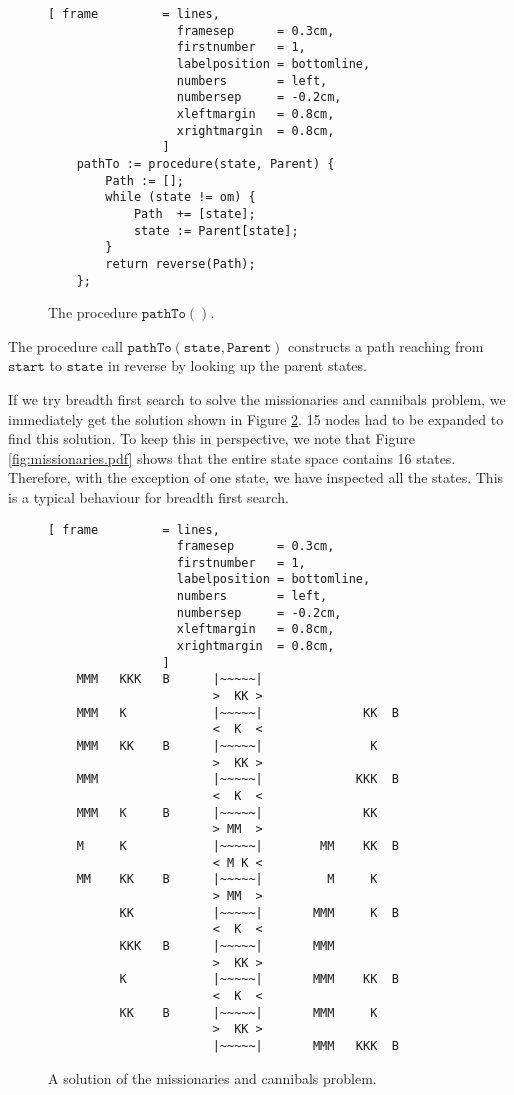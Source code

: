 \begin{figure}[!ht]
\centering
\begin{Verbatim}[ frame         = lines, 
                  framesep      = 0.3cm, 
                  firstnumber   = 1,
                  labelposition = bottomline,
                  numbers       = left,
                  numbersep     = -0.2cm,
                  xleftmargin   = 0.8cm,
                  xrightmargin  = 0.8cm,
                ]
    pathTo := procedure(state, Parent) {
        Path := [];
        while (state != om) {
            Path  += [state];
            state := Parent[state];
        }
        return reverse(Path);
    };
\end{Verbatim}
\vspace*{-0.3cm}
\caption{The procedure $\mathtt{pathTo}()$.}
\label{fig:pathTo.stlx}
\end{figure}
The procedure call $\mathtt{pathTo}(\mathtt{state}, \mathtt{Parent})$ constructs a path reaching
from $\mathtt{start}$ to $\mathtt{state}$ in reverse by looking up the parent states.

If we try breadth first search to solve the missionaries and cannibals problem, we immediately get
the solution shown in Figure \ref{fig:missionaries.solution}.  15 nodes had to be expanded to find
this solution.  To keep this in perspective, we note that Figure \ref{fig:missionaries.pdf} shows
that the entire state space contains 16 states.  Therefore, with the exception of one state, we have
inspected all the states.  This is a typical behaviour for breadth first search.

\begin{figure}[!ht]
\centering
\begin{Verbatim}[ frame         = lines, 
                  framesep      = 0.3cm, 
                  firstnumber   = 1,
                  labelposition = bottomline,
                  numbers       = left,
                  numbersep     = -0.2cm,
                  xleftmargin   = 0.8cm,
                  xrightmargin  = 0.8cm,
                ]
    MMM   KKK   B      |~~~~~|                   
                       >  KK >
    MMM   K            |~~~~~|              KK  B
                       <  K  <
    MMM   KK    B      |~~~~~|               K   
                       >  KK >
    MMM                |~~~~~|             KKK  B
                       <  K  <
    MMM   K     B      |~~~~~|              KK   
                       > MM  >
    M     K            |~~~~~|        MM    KK  B
                       < M K <
    MM    KK    B      |~~~~~|         M     K   
                       > MM  >
          KK           |~~~~~|       MMM     K  B
                       <  K  <
          KKK   B      |~~~~~|       MMM         
                       >  KK >
          K            |~~~~~|       MMM    KK  B
                       <  K  <
          KK    B      |~~~~~|       MMM     K   
                       >  KK >
                       |~~~~~|       MMM   KKK  B
\end{Verbatim}
\vspace*{-0.3cm}
\caption{A solution of the missionaries and cannibals problem.}
\label{fig:missionaries.solution}
\end{figure}

